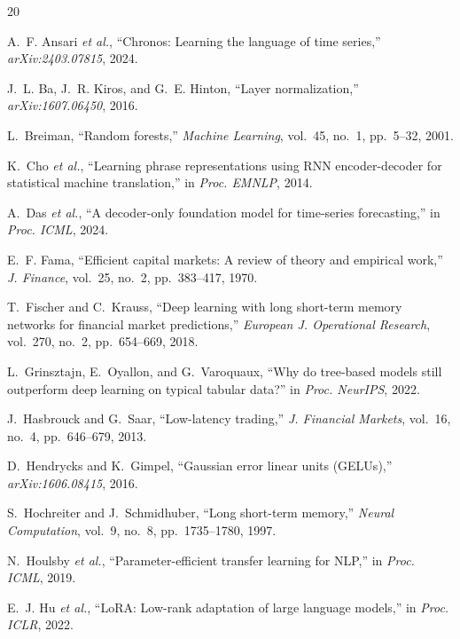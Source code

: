 \documentclass[10pt,conference]{IEEEtran}
\begin{document}

\begin{thebibliography}{20}

A.~F. Ansari \emph{et al.}, ``Chronos: Learning the language of time series,'' \emph{arXiv:2403.07815}, 2024.

J.~L. Ba, J.~R. Kiros, and G.~E. Hinton, ``Layer normalization,'' \emph{arXiv:1607.06450}, 2016.

L.~Breiman, ``Random forests,'' \emph{Machine Learning}, vol.~45, no.~1, pp.~5--32, 2001.

K.~Cho \emph{et al.}, ``Learning phrase representations using RNN encoder-decoder for statistical machine translation,'' in \emph{Proc. EMNLP}, 2014.

A.~Das \emph{et al.}, ``A decoder-only foundation model for time-series forecasting,'' in \emph{Proc. ICML}, 2024.

E.~F. Fama, ``Efficient capital markets: A review of theory and empirical work,'' \emph{J. Finance}, vol.~25, no.~2, pp.~383--417, 1970.

T.~Fischer and C.~Krauss, ``Deep learning with long short-term memory networks for financial market predictions,'' \emph{European J. Operational Research}, vol.~270, no.~2, pp.~654--669, 2018.

L.~Grinsztajn, E.~Oyallon, and G.~Varoquaux, ``Why do tree-based models still outperform deep learning on typical tabular data?'' in \emph{Proc. NeurIPS}, 2022.

J.~Hasbrouck and G.~Saar, ``Low-latency trading,'' \emph{J. Financial Markets}, vol.~16, no.~4, pp.~646--679, 2013.

D.~Hendrycks and K.~Gimpel, ``Gaussian error linear units (GELUs),'' \emph{arXiv:1606.08415}, 2016.

S.~Hochreiter and J.~Schmidhuber, ``Long short-term memory,'' \emph{Neural Computation}, vol.~9, no.~8, pp.~1735--1780, 1997.

N.~Houlsby \emph{et al.}, ``Parameter-efficient transfer learning for NLP,'' in \emph{Proc. ICML}, 2019.

E.~J. Hu \emph{et al.}, ``LoRA: Low-rank adaptation of large language models,'' in \emph{Proc. ICLR}, 2022.


\end{thebibliography}
\end{document}
